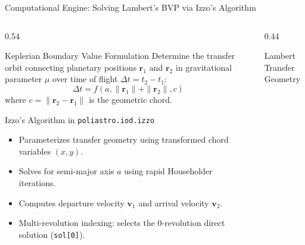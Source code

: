 \documentclass[aspectratio=169, 10pt]{beamer}
\begin{document}
\begin{frame}{Computational Engine: Solving Lambert's BVP via Izzo's Algorithm}
    \begin{columns}[t]
        \begin{column}{0.54\textwidth}
            \begin{block}{Keplerian Boundary Value Formulation}
                \scriptsize
                Determine the transfer orbit connecting planetary positions $\mathbf{r}_1$ and $\mathbf{r}_2$ in gravitational parameter $\mu$ over time of flight $\Delta t = t_2 - t_1$:
                \vspace{-0.08cm}
                \begin{equation}
                    \Delta t = f(a, \|\mathbf{r}_1\| + \|\mathbf{r}_2\|, c)
                \end{equation}
                \vspace{-0.15cm}
                where $c = \|\mathbf{r}_2 - \mathbf{r}_1\|$ is the geometric chord.
            \end{block}
            \vspace{-0.1cm}
            \begin{block}{Izzo's Algorithm in \texttt{poliastro.iod.izzo}}
                \scriptsize
                \begin{itemize}\setlength{\itemsep}{1pt}
                    \item Parameterizes transfer geometry using transformed chord variables $(x, y)$.
                    \item Solves for semi-major axis $a$ using rapid Householder iterations.
                    \item Computes departure velocity $\mathbf{v}_1$ and arrival velocity $\mathbf{v}_2$.
                    \item Multi-revolution indexing: selects the 0-revolution direct solution (\texttt{sol[0]}).
                \end{itemize}
            \end{block}
        \end{column}

        \begin{column}{0.44\textwidth}
            \begin{block}{Lambert Transfer Geometry}
                \centering
\end{block}
\end{column}
\end{columns}
\end{frame}
\end{document}
